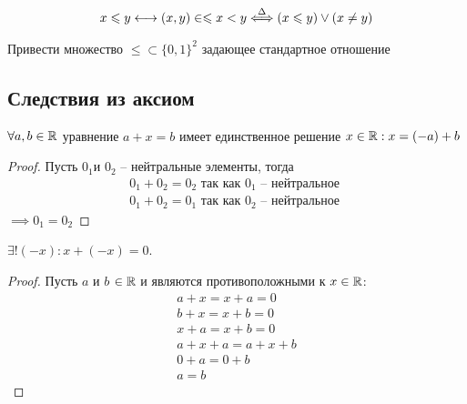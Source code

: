 \begin{note}
    \begin{gather}
        x \leqslant y \longleftrightarrow (x, y) \in \leqslant 
        x < y \stackrel{\Delta}{\Longleftrightarrow} (x \leqslant y) \lor (x \neq y)
    \end{gather}
\end{note}
\begin{exercise}
    Привести множество $ \leq \subset \{0, 1\}^2 $ задающее стандартное отношение
\end{exercise}
\subsection{Следствия из аксиом}
    \begin{theorem}
        $ \forall a, b \in  \mathbb{R} $ уравнение $ a + x  = b$ имеет единственное решение $ x \in \mathbb{R}: x = ( - a) + b $
    \end{theorem}
    \begin{theorem} \end{theorem}
    \begin{proof}
        Пусть  $ 0_1 $и $ 0_2 $ -- нейтральные элементы, тогда \begin{gather}
            0_1 + 0_2 = 0_2 \text{ так как } 0_1 \text{ -- нейтральное } \\
            0_1 + 0_2 = 0_1 \text{ так как } 0_2 \text{ -- нейтральное }
        \end{gather} $ \implies 0_1 = 0_2 $
    \end{proof}
        
    \begin{theorem}
        $\exists! (-x): x + (-x) = 0$.
    \end{theorem} \begin{proof}
        Пусть $ a $ и $ b $ $ \in \mathbb{R} $ и являются противоположными к
    $ x \in \mathbb{R} $:
    \begin{gather}
        a + x =  x + a = 0 \\ b + x =  x + b = 0 \\
       x + a =  x + b = 0 \\ a + x + a =  a + x + b \\ 0 + a =  0 + b \\
       a = b
    \end{gather} 
    \end{proof}
      
